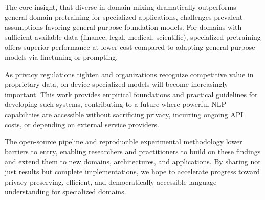 The core insight, that diverse in-domain mixing dramatically outperforms general-domain pretraining for specialized applications, challenges prevalent assumptions favoring general-purpose foundation models. For domains with sufficient available data (finance, legal, medical, scientific), specialized pretraining offers superior performance at lower cost compared to adapting general-purpose models via finetuning or prompting.

As privacy regulations tighten and organizations recognize competitive value in proprietary data, on-device specialized models will become increasingly important. This work provides empirical foundations and practical guidelines for developing such systems, contributing to a future where powerful NLP capabilities are accessible without sacrificing privacy, incurring ongoing API costs, or depending on external service providers.

The open-source pipeline and reproducible experimental methodology lower barriers to entry, enabling researchers and practitioners to build on these findings and extend them to new domains, architectures, and applications. By sharing not just results but complete implementations, we hope to accelerate progress toward privacy-preserving, efficient, and democratically accessible language understanding for specialized domains.
